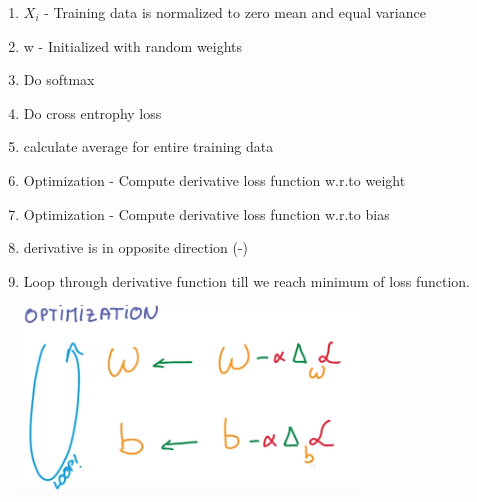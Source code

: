 \documentclass[a4paper,10pt]{article}
\begin{document}
 \begin{enumerate}
  \item $X_i$ - Training data is normalized to zero mean and equal variance
  \item w - Initialized with random weights
  \item Do softmax
  \item Do cross entrophy loss
  \item calculate average for entire training data
  \item Optimization - Compute derivative loss function w.r.to weight
   \item Optimization - Compute derivative loss function w.r.to bias
   \item derivative is in opposite direction (-)
   \item Loop through derivative function till we reach minimum of loss function.
 \end{enumerate}

 \includegraphics[width=10cm, height=5cm]{lcoptimize}
\end{document}
